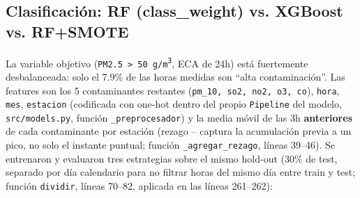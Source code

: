 \documentclass[11pt,a4paper]{article}
\begin{document}
\subsection{Clasificación: RF (class\_weight) vs. XGBoost vs. RF+SMOTE}
\label{sec:clasificacion}

La variable objetivo (\texttt{PM2.5 > 50~\textmu g/m\textsuperscript{3}}, ECA de 24h)
está fuertemente desbalanceada: solo el 7.9\% de las horas medidas son ``alta
contaminación''. Las features son los 5 contaminantes restantes
(\texttt{pm\_10, so2, no2, o3, co}), \texttt{hora}, \texttt{mes}, \texttt{estacion}
(codificada con one-hot dentro del propio \texttt{Pipeline} del modelo,
\texttt{src/\allowbreak models.py}, función \texttt{\_preprocesador}) y la media móvil
de las 3h \textbf{anteriores} de cada contaminante por estación (rezago -- captura la
acumulación previa a un pico, no solo el instante puntual; función
\texttt{\_agregar\_rezago}, líneas 39--46). Se entrenaron y evaluaron tres estrategias
sobre el mismo hold-out (30\% de test, separado por día calendario para no filtrar
horas del mismo día entre train y test; función \texttt{dividir}, líneas 70--82,
aplicada en las líneas 261--262):

\begin{table}[h!]
\centering
\small
{}
\caption{Métricas sobre la clase minoritaria (``alta contaminación''), $n_{test}=93{,}793$ horas.}
\end{table}
\end{document}
